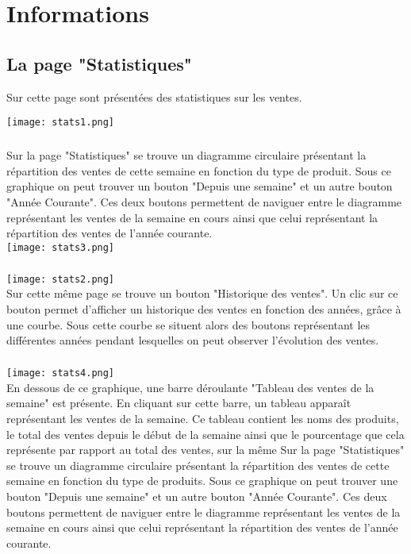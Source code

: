 \chapter{Informations}

\section{La page "Statistiques"}
Sur cette page sont présentées des statistiques sur les ventes.

\texttt{[image: stats1.png]}
\paragraph{}
Sur la page "Statistiques" se trouve un diagramme circulaire présentant la
répartition des ventes de cette semaine en fonction du type de produit. Sous
ce graphique on peut trouver un bouton "Depuis une semaine" et un autre bouton
"Année Courante". Ces deux boutons permettent de naviguer entre le diagramme
représentant les ventes de la semaine en cours ainsi que celui représentant la
répartition des ventes de l'année courante.\\

\texttt{[image: stats3.png]}

\paragraph{}
\texttt{[image: stats2.png]}\\
Sur cette même page se trouve un bouton "Historique des ventes". Un clic sur ce
bouton permet d'afficher un historique des ventes en fonction des années,
grâce à une courbe. Sous cette courbe se situent alors des boutons représentant
les différentes années pendant lesquelles on peut observer l'évolution des ventes.

\paragraph{}
\texttt{[image: stats4.png]}\\
En dessous de ce graphique, une barre déroulante "Tableau des ventes de la
semaine" est présente. En cliquant sur cette barre, un tableau apparaît
représentant les ventes de la semaine. Ce tableau contient les noms des
produits, le total des ventes depuis le début de la semaine ainsi que le
pourcentage que cela représente par rapport au total des ventes, sur la même
Sur la page "Statistiques" se trouve un diagramme circulaire présentant la
répartition des ventes de cette semaine en fonction du type de produits. Sous
ce graphique on peut trouver une bouton "Depuis une semaine" et un autre bouton
"Année Courante". Ces deux boutons permettent de naviguer entre le diagramme
représentant les ventes de la semaine en cours ainsi que celui représentant la
répartition des ventes de l'année courante.

